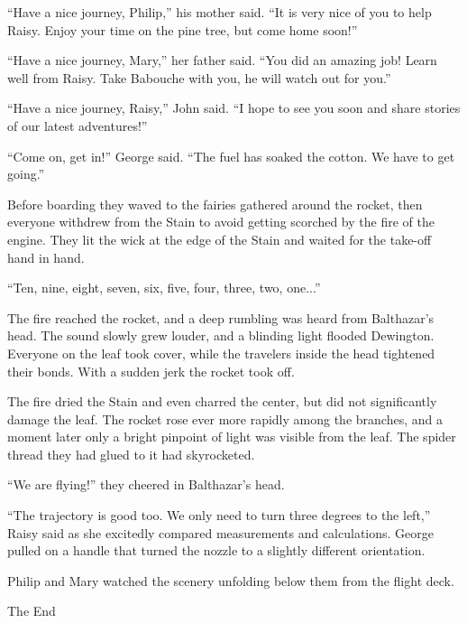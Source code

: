 \documentclass[10pt, draft]{memoir}
\begin{document}
``Have a nice journey, Philip,'' his mother said. ``It is very nice of you to help Raisy. Enjoy your time on the pine tree, but come home soon!''

``Have a nice journey, Mary,'' her father said. ``You did an amazing job! Learn well from Raisy. Take Babouche with you, he will watch out for you.''

``Have a nice journey, Raisy,'' John said. ``I hope to see you soon and share stories of our latest adventures!''

``Come on, get in!'' George said. ``The fuel has soaked the cotton. We have to get going.''

Before boarding they waved to the fairies gathered around the rocket, then everyone withdrew from the Stain to avoid getting scorched by the fire of the engine. They lit the wick at the edge of the Stain and waited for the take-off hand in hand.

``Ten, nine, eight, seven, six, five, four, three, two, one...''

The fire reached the rocket, and a deep rumbling was heard from Balthazar's head. The sound slowly grew louder, and a blinding light flooded Dewington. Everyone on the leaf took cover, while the travelers inside the head tightened their bonds. With a sudden jerk the rocket took off.

The fire dried the Stain and even charred the center, but did not significantly damage the leaf. The rocket rose ever more rapidly among the branches, and a moment later only a bright pinpoint of light was visible from the leaf. The spider thread they had glued to it had skyrocketed.

``We are flying!'' they cheered in Balthazar's head.

``The trajectory is good too. We only need to turn three degrees to the left,'' Raisy said as she excitedly compared measurements and calculations. George pulled on a handle that turned the nozzle to a slightly different orientation.

Philip and Mary watched the scenery unfolding below them from the flight deck.

\begin{center}
The End
\end{center}%
\end{document}
